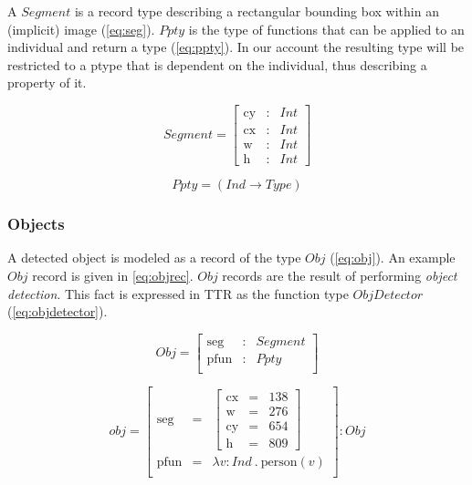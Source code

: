 \documentclass[11pt, a4paper]{article}
\begin{document}
A $Segment$ is a record type describing a rectangular bounding box within an (implicit) image (\autoref{eq:seg}).
$Ppty$ is the type of functions that can be applied to an individual and return a type (\autoref{eq:ppty}).
In our account the resulting type will be restricted to a ptype that is dependent on the individual, thus describing a property of it.

\begin{equation}\label{eq:seg}
Segment = \left[\begin{array}{rcl}
\text{cy} &:& Int\\
\text{cx} &:& Int\\
\text{w} &:& Int\\
\text{h} &:& Int
\end{array}\right]\end{equation}

\begin{equation}\label{eq:ppty}
Ppty = (Ind \rightarrow Type)\end{equation}

\subsubsection{Objects}

A detected object is modeled as a record of the type $Obj$ (\autoref{eq:obj}).
An example $Obj$ record is given in \autoref{eq:objrec}.
$Obj$ records are the result of performing \textit{object detection}.
This fact is expressed in TTR as the function type $ObjDetector$ (\autoref{eq:objdetector}).

\begin{equation}\label{eq:obj}
Obj = \left[\begin{array}{rcl}
\text{seg} &:& Segment\\
\text{pfun} &:& Ppty \\
\end{array}\right]\end{equation}

\begin{equation}\label{eq:objrec}
obj =
\left[\begin{array}{rcl}
\text{seg} &=& \left[\begin{array}{rcl}
\text{cx} &=& 138\\
\text{w} &=& 276\\
\text{cy} &=& 654\\
\text{h} &=& 809
\end{array}\right]\\
\text{pfun} &=& \lambda v:Ind\ .\ \text{person}(v)\\
\end{array}\right] : Obj\end{equation}
\end{document}
